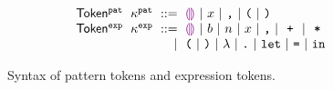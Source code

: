 \begin{figure}
  \vspace{-3px}
  \[
  \arraycolsep=3pt\begin{array}{rlrl}
      \mathsf{Token^{\pat}} & \kappa^{\pat} & ::= &
        \shole ~\vert~
        \svar{x} ~\vert~
        \sprod{}{} ~\vert~
        \texttt{(} ~\vert~
        \texttt{)} \\
      \mathsf{Token^{\expr}} & \kappa^{\expr} & ::= &
        \shole ~\vert~
        \sboollit{b} ~\vert~
        \snumlit{n} ~\vert~
        \svar{x} ~\vert~
        \sprod{}{} ~\vert~
        \splus{}{} ~\vert~
        \smult{}{} \\
      & & \vert &
        \texttt{(} ~\vert~
        \texttt{)} ~\vert~
        \lambda ~\vert~
        \texttt{.} ~\vert~
        \texttt{let} ~\vert~
        \texttt{=} ~\vert~
        \texttt{in}
  \end{array}\]
  \caption{
    Syntax of pattern tokens and expression tokens.
  }
  \label{fig:language-syntax}
\end{figure}
